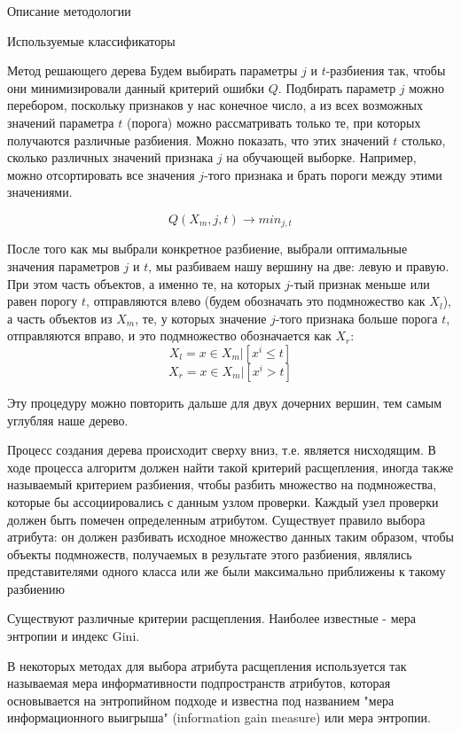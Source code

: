\begin{section}{Описание методологии}
\begin{subsection}{Используемые классификаторы}
\begin{subsubsection}{Метод решающего дерева}
   Будем выбирать параметры $j$ и $t$-разбиения так, чтобы они минимизировали данный критерий ошибки $Q$. Подбирать параметр $j$ можно перебором, поскольку признаков у нас конечное число, а из всех возможных значений параметра $t$ (порога) можно рассматривать только те, при которых получаются различные разбиения. Можно показать, что этих значений $t$ столько, сколько различных значений признака $j$ на обучающей выборке. Например, можно отсортировать все значения $j$-того признака и брать пороги между этими значениями.

      \begin{equation}
	Q(X_m,j,t) \rightarrow min_{j,t}
  \end{equation}

   После того как мы выбрали конкретное разбиение, выбрали оптимальные значения параметров $j$ и $t$, мы разбиваем нашу вершину на две: левую и правую. При этом часть объектов, а именно те, на которых $j$-тый признак меньше или равен порогу $t$, отправляются влево (будем обозначать это подмножество как $X_l$), а часть объектов из $X_m$, те, у которых значение $j$-того признака больше порога $t$, отправляются вправо, и это подмножество обозначается как $X_r$:
         \begin{equation}
		X_l = {x \in X_m | [x^i \leq t ]}
  \end{equation}
           \begin{equation}
		X_r = {x \in X_m | [x^i > t ]}
  \end{equation}

   Эту процедуру можно повторить дальше для двух дочерних вершин, тем самым углубляя наше дерево.
   
   Процесс создания дерева происходит сверху вниз, т.е. является нисходящим. В ходе процесса алгоритм должен найти такой критерий расщепления, иногда также называемый критерием разбиения, чтобы разбить множество на подмножества, которые бы ассоциировались с данным узлом проверки. Каждый узел проверки должен быть помечен определенным атрибутом. Существует правило выбора атрибута: он должен разбивать исходное множество данных таким образом, чтобы объекты подмножеств, получаемых в результате этого разбиения, являлись представителями одного класса или же были максимально приближены к такому разбиению

Существуют различные критерии расщепления. Наиболее известные - мера энтропии и индекс Gini.

В некоторых методах для выбора атрибута расщепления используется так называемая мера информативности подпространств атрибутов, которая основывается на энтропийном подходе и известна под названием "мера информационного выигрыша" (information gain measure) или мера энтропии.


\end{subsubsection}
\end{subsection}
\end{section}
